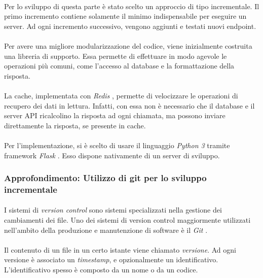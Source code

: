 \documentclass[11pt,a4paper,english]{article}
\begin{document}
\paragraph{} Per lo sviluppo di questa parte è stato scelto un approccio di tipo incrementale. Il primo incremento contiene solamente il minimo indispensabile per eseguire un server. Ad ogni incremento successivo, vengono aggiunti e testati nuovi endpoint.

\paragraph{} Per avere una migliore modularizzazione del codice, viene inizialmente costruita una libreria di supporto. Essa permette di effettuare in modo agevole le operazioni più comuni, come l'accesso al database e la formattazione della risposta. 

\paragraph{} La cache, implementata con \emph{Redis} \cite{redis}, permette di velocizzare le operazioni di recupero dei dati in lettura. Infatti, con essa non è necessario che il database e il server API ricalcolino la risposta ad ogni chiamata, ma possono inviare direttamente la risposta, se presente in cache.

\paragraph{} Per l'implementazione, si è scelto di usare il linguaggio \emph{Python 3} \cite{python} tramite framework \emph{Flask} \cite{flask}. Esso dispone nativamente di un server di sviluppo.  

\subsubsection{Approfondimento: Utilizzo di git per lo sviluppo incrementale}

\paragraph{} I sistemi di \emph{version control} sono sistemi specializzati nella gestione dei cambiamenti dei file. Uno dei sistemi di version control maggiormente utilizzati nell'ambito della produzione e manutenzione di software è il \emph{Git} \cite{git}.

\paragraph{} Il contenuto di un file in un certo istante viene chiamato \emph{versione}. Ad ogni versione è associato un \emph{timestamp}, e opzionalmente un identificativo. L'identificativo spesso è composto da un nome o da un codice. 
\end{document}
